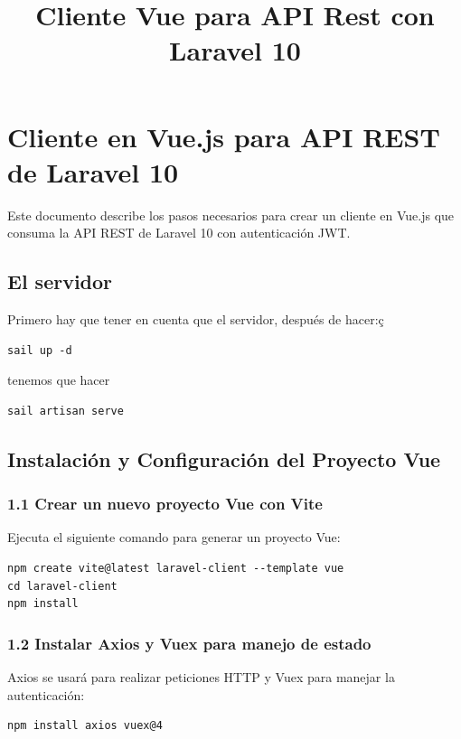\documentclass[11pt]{article}
\date{}
\title{Cliente Vue para API Rest con Laravel 10}
\begin{document}
\maketitle
\setcounter{tocdepth}{3}
\tableofcontents

\setlength\parindent{10pt}
\section{Cliente en Vue.js para API REST de Laravel 10}
\label{sec:org304e2b2}

Este documento describe los pasos necesarios para crear un cliente en
Vue.js que consuma la API REST de Laravel 10 con autenticación JWT.

\subsection{El servidor}
\label{sec:orgd9bc374}
Primero hay que tener en cuenta que el servidor, después de hacer:ç
\begin{verbatim}
sail up -d
\end{verbatim}
tenemos que hacer
\begin{verbatim}
sail artisan serve
\end{verbatim}
\subsection{Instalación y Configuración del Proyecto Vue}
\label{sec:org2b886c4}

\subsubsection{1.1 Crear un nuevo proyecto Vue con Vite}
\label{sec:org3947a9d}
Ejecuta el siguiente comando para generar un proyecto Vue:

\begin{verbatim}
npm create vite@latest laravel-client --template vue
cd laravel-client
npm install
\end{verbatim}

\subsubsection{1.2 Instalar Axios y Vuex para manejo de estado}
\label{sec:org4daf60c}
Axios se usará para realizar peticiones HTTP y Vuex para manejar la autenticación:

\begin{verbatim}
npm install axios vuex@4
\end{verbatim}
\end{document}
